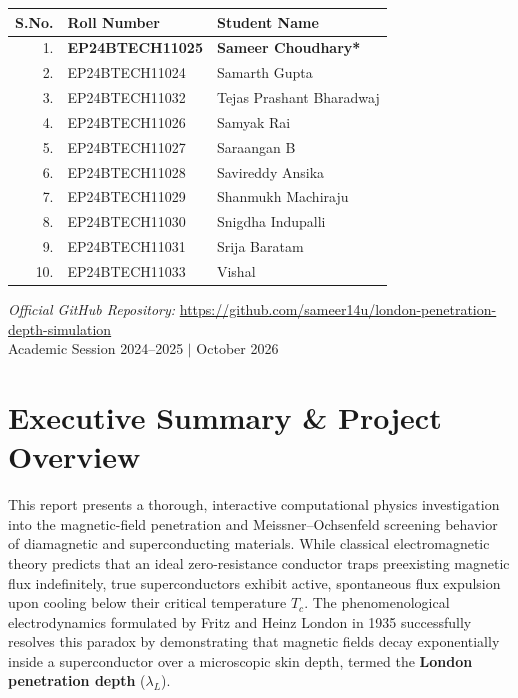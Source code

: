 \documentclass[11pt,a4paper]{article}
\begin{document}
\begin{titlepage}
    \begin{table}[H]
        \centering
        \renewcommand{\arraystretch}{1.2}
        \begin{tabular}{r l l}
            \toprule
            \textbf{S.No.} & \textbf{Roll Number} & \textbf{Student Name} \\
            \midrule
            1. & \textbf{EP24BTECH11025} & \textbf{Sameer Choudhary*} \\
            2. & EP24BTECH11024 & Samarth Gupta \\
            3. & EP24BTECH11032 & Tejas Prashant Bharadwaj \\
            4. & EP24BTECH11026 & Samyak Rai \\
            5. & EP24BTECH11027 & Saraangan B \\
            6. & EP24BTECH11028 & Savireddy Ansika \\
            7. & EP24BTECH11029 & Shanmukh Machiraju \\
            8. & EP24BTECH11030 & Snigdha Indupalli \\
            9. & EP24BTECH11031 & Srija Baratam \\
            10. & EP24BTECH11033 & Vishal \\
            \bottomrule
        \end{tabular}
    \end{table}
    
    \vfill
    {\small \textit{Official GitHub Repository:} \url{https://github.com/sameer14u/london-penetration-depth-simulation}}\\[0.1cm]
    {\small Academic Session 2024--2025 $|$ October 2026}
\end{titlepage}

\newpage
{}
\tableofcontents
\newpage
{}

\section{Executive Summary \& Project Overview}

This report presents a thorough, interactive computational physics investigation into the magnetic-field penetration and Meissner--Ochsenfeld screening behavior of diamagnetic and superconducting materials. While classical electromagnetic theory predicts that an ideal zero-resistance conductor traps preexisting magnetic flux indefinitely, true superconductors exhibit active, spontaneous flux expulsion upon cooling below their critical temperature $T_c$. The phenomenological electrodynamics formulated by Fritz and Heinz London in 1935 successfully resolves this paradox by demonstrating that magnetic fields decay exponentially inside a superconductor over a microscopic skin depth, termed the \textbf{London penetration depth} ($\lambda_L$).
\end{document}
